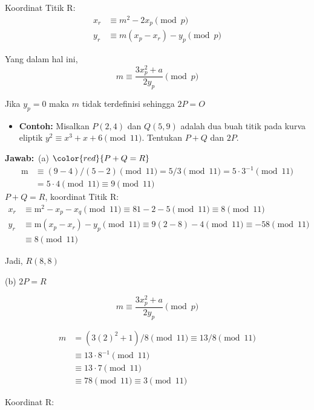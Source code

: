\documentclass{article}
\begin{document}
Koordinat Titik R:
\begin{align*}
x_r &\equiv m^2 - 2x_p \pmod{p} \\
y_r &\equiv m(x_p - x_r) - y_p \pmod{p}
\end{align*}

Yang dalam hal ini,
\[ m \equiv \frac{3x_p^2 + a}{2y_p} \pmod{p} \]

Jika $y_p = 0$ maka $m$ tidak terdefinisi sehingga $2P = O$

\newpage


\begin{itemize}
    \item \textbf{Contoh:} Misalkan $P(2, 4)$ dan $Q(5, 9)$ adalah dua buah titik pada kurva eliptik $y^2 \equiv x^3 + x + 6 \pmod{11}$. Tentukan $P + Q$ dan $2P$.
\end{itemize}

\textbf{Jawab:}\
(a) $\color{red}{P + Q = R}$
\[
\begin{aligned}
\text{m} & \equiv (9 - 4)/(5 - 2) \pmod{11} = 5/3 \pmod{11} = 5 \cdot 3^{-1} \pmod{11} \\
& = 5 \cdot 4 \pmod{11} \equiv 9 \pmod{11}
\end{aligned}
\]
$P + Q = R$, koordinat Titik R:
\[
\begin{aligned}
x_r & \equiv \text{m}^2 - x_p - x_q \pmod{11} \equiv 81 - 2 - 5 \pmod{11} \equiv 8 \pmod{11} \\
y_r & \equiv \text{m}(x_p - x_r) - y_p \pmod{11} \equiv 9(2 - 8) - 4 \pmod{11} \equiv -58 \pmod{11} \\
& \equiv 8 \pmod{11}
\end{aligned}
\]

Jadi, $R(8, 8)$

\newpage


(b) $2P = R$

\[ m \equiv \frac{3x_p^2 + a}{2y_p} \pmod{p} \]

\begin{align*}
 m &= (3(2)^2 + 1)/8 \pmod{11} \equiv 13/8 \pmod{11} \\
 &\equiv 13 \cdot 8^{-1} \pmod{11} \\
 &\equiv 13 \cdot 7 \pmod{11} \\
 &\equiv 78 \pmod{11} \equiv 3 \pmod{11} 
\end{align*}

Koordinat R:
\end{document}
